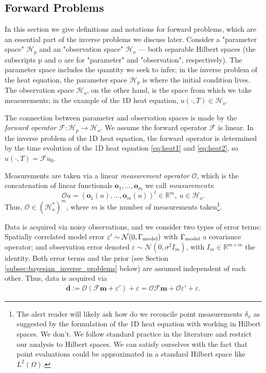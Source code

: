 \documentclass[ba]{imsart}
\newcommand{\R}{\ensuremath{\mathbb{R}}}
\newcommand{\eps}{\varepsilon}
\newcommand{\hilp}{\mathcal{H}_p}
\newcommand{\hilo}{\mathcal{H}_o}
\newcommand{\obs}{\mathcal{O}}
\newcommand{\fwd}{\mathcal{F}}
\newcommand{\data}{\mathbf{d}}
\newcommand{\param}{\mathbf{m}}
\newcommand{\normal}{\mathcal{N}}
\newcommand{\meas}{\mathbf{o}}
\theoremstyle{plain}
\theoremstyle{definition}
\theoremstyle{remark}
\begin{document}
\subsection{Forward Problems}\label{subsec:abstract_OED}
In this section we give definitions and notations for forward problems,
which are an essential part of the inverse problems we discuss
later. Consider a "parameter space" \(\hilp\) and an "observation
space" \(\hilo\) --- both separable Hilbert spaces (the subscripts p
and o are for "parameter" and "observation", respectively). The
parameter space includes the quantity we seek to infer; in the inverse
problem of the heat equation, the parameter space $\hilp$ is where the
initial condition lives. The observation space $\hilo$, on the other
hand, is the space from which we take measurements; in the example of
the 1D heat equation, $u(\cdot, T) \in \hilo$.

The connection between parameter and observation spaces is made by the
\emph{forward operator} \(\fwd: \hilp \to \hilo\). We assume the
forward operator \(\fwd\) is linear. In the inverse problem of the 1D
heat equation, the forward operator is determined by the time
evolution of the 1D heat equation \eqref{eq:heat1} and
\eqref{eq:heat2}, so $u(\cdot, T) = \fwd u_0$.

Measurements are taken via a linear \emph{measurement operator}
\(\obs\), which is the concatenation of linear functionals
$\meas_1,\dots,\meas_m$ we call \emph{measurements}:
\begin{equation*}\obs u = (\meas_1(u), \dots, \meas_m(u) )^t \in \R^m,\ u \in \hilo.
\end{equation*}
Thus, \(\obs \in ( \hilo^* )^m\), where \(m\) is the number of
measurements taken\footnote{The alert reader will likely ask how do we
reconcile point measurements $\delta_x$ as suggested by the
formulation of the 1D heat equation with working in Hilbert spaces. We
don't. We follow standard practice in the literature and restrict our
analysis to Hilbert spaces. We can satisfy ourselves with the fact
that point evaluations could be approximated in a standard Hilbert
space like $L^2(\Omega)$.}.

Data is acquired via noisy observations, and we consider two types of
error terms: Spatially correlated model error \(\eps' \sim
\normal(0,\modcov)\) with \(\Gamma_{\textup{model}}\) a covariance operator; and
observation error denoted \(\eps \sim \normal(0, \sigma^2 I_m)\), with
\(I_m \in \mathbb{R}^{m \times m}\) the identity. Both error terms and
the prior (see Section \ref{subsec:bayesian_inverse_problems} below)
are assumed independent of each other. Thus, data is acquired via
\begin{align}\label{eq:inverse_problem}
  \data := \obs (\fwd \param + \eps') + \eps = \obs \fwd \param + \obs \eps' + \eps.
\end{align}
\end{document}
